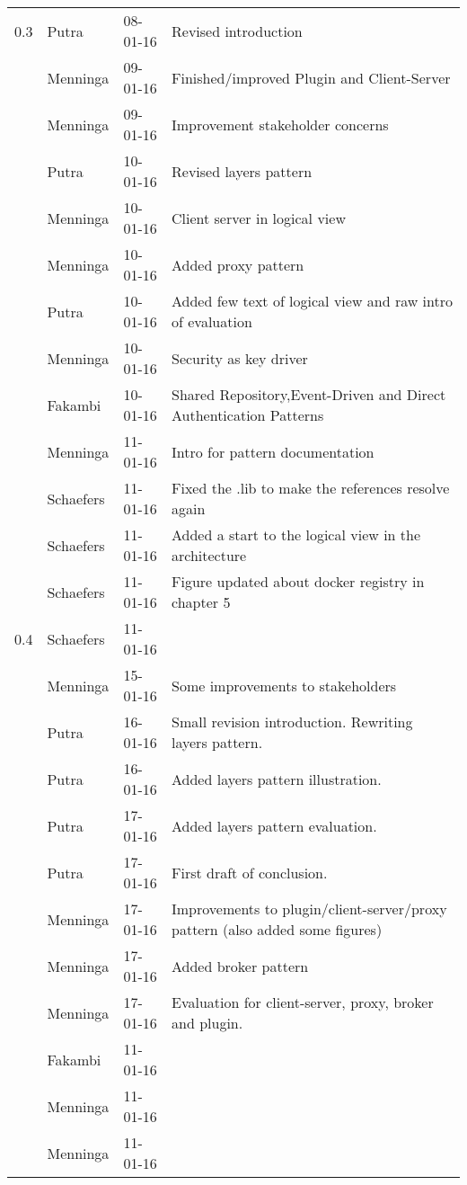\begin{longtable}{L{} L{} L{} L{}}
				0.3 & Putra		& 08-01-16 & Revised introduction \\
					& Menninga	& 09-01-16 & Finished/improved Plugin and Client-Server \\
					& Menninga	& 09-01-16 & Improvement stakeholder concerns \\
					& Putra		& 10-01-16 & Revised layers pattern \\
					& Menninga	& 10-01-16 & Client server in logical view \\
					& Menninga	& 10-01-16 & Added proxy pattern \\
					& Putra		& 10-01-16 & Added few text of logical view and raw intro of evaluation \\
					& Menninga  & 10-01-16 & Security as key driver \\
					& Fakambi   & 10-01-16 & Shared Repository,Event-Driven and Direct Authentication Patterns\\
					& Menninga  & 11-01-16 & Intro for pattern documentation \\
					& Schaefers & 11-01-16 & Fixed the .lib to make the references resolve again \\
					& Schaefers & 11-01-16 & Added a start to the logical view in the architecture \\
					& Schaefers & 11-01-16 & Figure updated about docker registry in chapter 5\\
				\midrule

				0.4 & Schaefers & 11-01-16 & \\
					& Menninga	& 15-01-16 & Some improvements to stakeholders \\
					& Putra		& 16-01-16 & Small revision introduction. Rewriting layers pattern. \\
					& Putra		& 16-01-16 & Added layers pattern illustration. \\
					& Putra		& 17-01-16 & Added layers pattern evaluation. \\
					& Putra		& 17-01-16 & First draft of conclusion. \\
					& Menninga  & 17-01-16 & Improvements to plugin/client-server/proxy pattern (also added some figures) \\
					& Menninga  & 17-01-16 & Added broker pattern \\
					& Menninga  & 17-01-16 & Evaluation for client-server, proxy, broker and plugin. \\
					& Fakambi   & 11-01-16 & \\
					& Menninga  & 11-01-16 & \\
					& Menninga  & 11-01-16 & \\
				\midrule


\end{longtable}